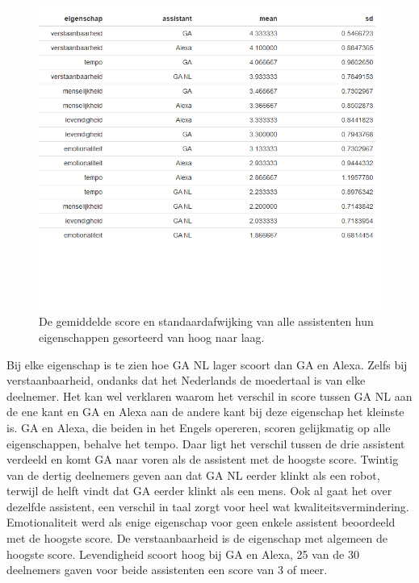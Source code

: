\begin{figure}[h]
    \includegraphics[width=0.9\linewidth]{../onderzoek/onderzoeksresultaten/vergelijking_assistenten_per_eigenschap/table_mean_sd_scores}
    \caption{De gemiddelde score en standaardafwijking van alle assistenten hun eigenschappen gesorteerd van hoog naar laag.}
    \label{fig:table-mean-sd-scores}
\end{figure}

Bij elke eigenschap is te zien hoe GA NL lager scoort dan GA en Alexa. Zelfs bij verstaanbaarheid, ondanks dat het Nederlands de moedertaal is van elke deelnemer. Het kan wel verklaren waarom het verschil in score tussen GA NL aan de ene kant en GA en Alexa aan de andere kant bij deze eigenschap het kleinste is. GA en Alexa, die beiden in het Engels opereren, scoren gelijkmatig op alle eigenschappen, behalve het tempo. Daar ligt het verschil tussen de drie assistent verdeeld en komt GA naar voren als de assistent met de hoogste score.
Twintig van de dertig deelnemers geven aan dat GA NL eerder klinkt als een robot, terwijl de helft vindt dat GA eerder klinkt als een mens. Ook al gaat het over dezelfde assistent, een verschil in taal zorgt voor heel wat kwaliteitsvermindering.
Emotionaliteit werd als enige eigenschap voor geen enkele assistent beoordeeld met de hoogste score. De verstaanbaarheid is de eigenschap met algemeen de hoogste score.
Levendigheid scoort hoog bij GA en Alexa, 25 van de 30 deelnemers gaven voor beide assistenten een score van 3 of meer.

